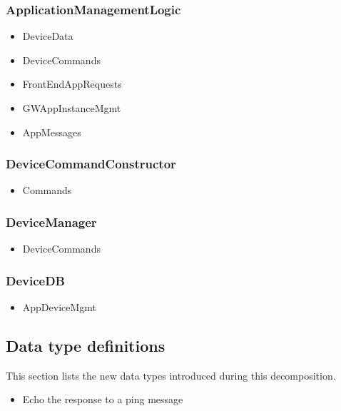     \subsubsection{ApplicationManagementLogic}
        \begin{itemize}
            \item DeviceData
            \item DeviceCommands
            \item FrontEndAppRequests
            \item GWAppInstanceMgmt
            \item AppMessages
        \end{itemize}

    \subsubsection{DeviceCommandConstructor}
        \begin{itemize}
            \item Commands
        \end{itemize}

    \subsubsection{DeviceManager}
        \begin{itemize}
            \item DeviceCommands
        \end{itemize}

    \subsubsection{DeviceDB}
        \begin{itemize}
            \item AppDeviceMgmt
        \end{itemize}


\subsection{Data type definitions}
    This section lists the new data types introduced during this decomposition.

    \begin{itemize}
        \item Echo the response to a ping message
    \end{itemize}
